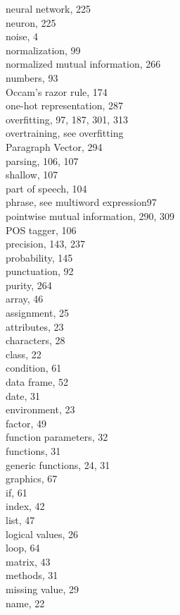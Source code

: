 \documentclass[10pt]{book}
\begin{document}
neural network, 225\\
neuron, 225\\
noise, 4\\
normalization, 99\\
normalized mutual information, 266\\
numbers, 93\\
Occam's razor rule, 174\\
one-hot representation, 287\\
overfitting, 97, 187, 301, 313\\
overtraining, see overfitting\\
Paragraph Vector, 294\\
parsing, 106, 107\\
shallow, 107\\
part of speech, 104\\
phrase, see multiword expression97\\
pointwise mutual information, 290, 309\\
POS tagger, 106\\
precision, 143, 237\\
probability, 145\\
punctuation, 92\\
purity, 264\\
array, 46\\
assignment, 25\\
attributes, 23\\
characters, 28\\
class, 22\\
condition, 61\\
data frame, 52\\
date, 31\\
environment, 23\\
factor, 49\\
function parameters, 32\\
functions, 31\\
generic functions, 24, 31\\
graphics, 67\\
if, 61\\
index, 42\\
list, 47\\
logical values, 26\\
loop, 64\\
matrix, 43\\
methods, 31\\
missing value, 29\\
name, 22\\
\end{document}
